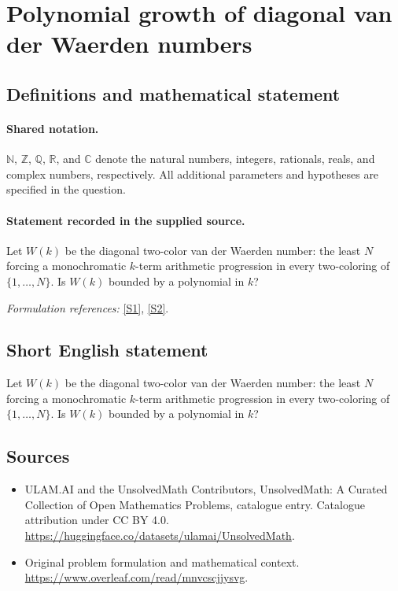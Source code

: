 \documentclass[11pt]{article}
\newcommand{\sref}[2]{\hyperlink{source:#1:#2}{[S#2]}}
\begin{document}
\section{Polynomial growth of diagonal van der Waerden numbers}\label{statement}

\subsection{Definitions and mathematical statement}

\paragraph{Shared notation.}$\mathbb N$, $\mathbb Z$, $\mathbb Q$, $\mathbb R$, and $\mathbb C$ denote the natural numbers, integers, rationals, reals, and complex numbers, respectively. All additional parameters and hypotheses are specified in the question.


\paragraph{Statement recorded in the supplied source.}
Let $W(k)$ be the diagonal two-color van der Waerden number: the least $N$ forcing a monochromatic $k$-term arithmetic progression in every two-coloring of $\{1,\ldots,N\}$. Is $W(k)$ bounded by a polynomial in $k$?
\par\smallskip\textit{Formulation references:} \sref{statement}{1}, \sref{statement}{2}.
\subsection{Short English statement}
Let $W(k)$ be the diagonal two-color van der Waerden number: the least $N$ forcing a monochromatic $k$-term arithmetic progression in every two-coloring of $\{1,\ldots,N\}$. Is $W(k)$ bounded by a polynomial in $k$?
\subsection{Sources}
\begin{itemize}
\item[\hypertarget{source:statement:1}{S1}] ULAM.AI and the UnsolvedMath Contributors, UnsolvedMath: A Curated Collection of Open Mathematics Problems, catalogue entry. Catalogue attribution under CC BY 4.0.
\url{https://huggingface.co/datasets/ulamai/UnsolvedMath}.
\item[\hypertarget{source:statement:2}{S2}] Original problem formulation and mathematical context.
\url{https://www.overleaf.com/read/mnvcscjjysvg}.
\end{itemize}
\label{end:statement}
\end{document}
